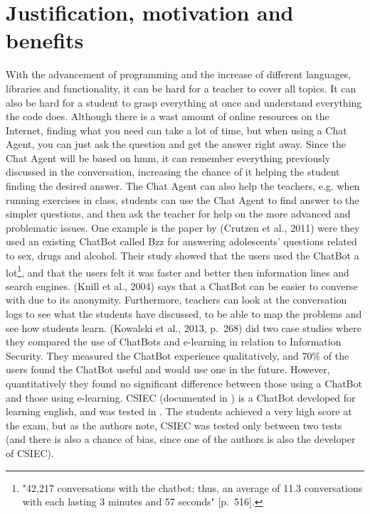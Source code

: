 \section{Justification, motivation and benefits}
\label{chapter2:justification}
With the advancement of programming and the increase of different languages, libraries and functionality, it can be hard for a teacher to cover all topics. It can also be hard for a student to grasp everything at once and understand everything the code does. Although there is a wast amount of online resources on the 
Internet, finding what you need can take a lot of time, but when using a Chat Agent, you can just ask the question and get the answer right away. Since the Chat Agent will be based on \gls{hmm}, it can remember everything previously discussed in the conversation, increasing the chance of it helping the student finding the desired answer. The Chat Agent can also help the teachers, e.g. when running exercises in class, students can use the Chat Agent to find answer to the simpler questions, and then ask the teacher for help on the more advanced and problematic issues.
\vspace{0.5em}\newline
One example is the paper by (Crutzen et al., 2011) \cite{crutzen2011:aiAgentAdolescentQA} were they used an existing ChatBot called Bzz for answering adolescents' questions related to sex, drugs and alcohol. Their study showed that the users used the ChatBot a lot\footnote{"42,217 conversations with the chatbot; thus, an average of 11.3 conversations with each lasting 3 minutes and 57 seconds" [p.~516]\cite{crutzen2011:aiAgentAdolescentQA}.}, and that the users felt it was faster and better then information lines and search engines. (Knill et al., 2004) \cite{KnillEtAl2004:AiMathCollege} says that a ChatBot can be easier to converse with due to its anonymity. Furthermore, teachers can look at the conversation logs to see what the students have discussed, to be able to map the problems and see how students learn.
\vspace{0.5em}\newline
(Kowalski et al., 2013, p.~268) \cite{KowalskiEtAl2013:ChatbotsSecurityTraining} did two case studies where they compared the use of ChatBots and e-learning in relation to Information Security. They measured the ChatBot experience qualitatively, and 70\% of the users found the ChatBot useful and would use one in the future. However, quantitatively they found no significant difference between those using a ChatBot and those using e-learning. CSIEC (documented in \cite{jia2009:csiec}) is a ChatBot developed for learning english, and was tested in \cite{JiaAndRuan2008:CSIEC_caseStudy}. The students achieved a very high score at the exam, but as the authors note, CSIEC was tested only between two tests (and there is also a chance of bias, since one of the authors is also the developer of CSIEC).


